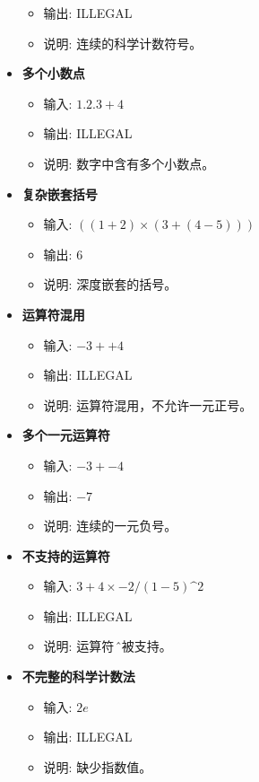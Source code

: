 \documentclass{article}
\begin{document}
\begin{itemize}
\begin{itemize}
        \item 输出: ILLEGAL
        \item 说明: 连续的科学计数符号。
    \end{itemize}
    \item \textbf{多个小数点}
    \begin{itemize}
        \item 输入: \(1.2.3 + 4\)
        \item 输出: ILLEGAL
        \item 说明: 数字中含有多个小数点。
    \end{itemize}
    \item \textbf{复杂嵌套括号}
    \begin{itemize}
        \item 输入: \(((1 + 2) \times (3 + (4 - 5)))\)
        \item 输出: \(6\)
        \item 说明: 深度嵌套的括号。
    \end{itemize}
    \item \textbf{运算符混用}
    \begin{itemize}
        \item 输入: \(-3 + +4\)
        \item 输出: ILLEGAL
        \item 说明: 运算符混用，不允许一元正号。
    \end{itemize}
    \item \textbf{多个一元运算符}
    \begin{itemize}
        \item 输入: \(-3 + -4\)
        \item 输出: \(-7\)
        \item 说明: 连续的一元负号。
    \end{itemize}
    \item \textbf{不支持的运算符}
    \begin{itemize}
        \item 输入: \(3 + 4 \times -2 / (1 - 5)\^2\)
        \item 输出: ILLEGAL
        \item 说明: 运算符 \^ 不被支持。
    \end{itemize}
    \item \textbf{不完整的科学计数法}
    \begin{itemize}
        \item 输入: \(2e\)
        \item 输出: ILLEGAL
        \item 说明: 缺少指数值。

\end{itemize}
\end{itemize}
\end{document}
